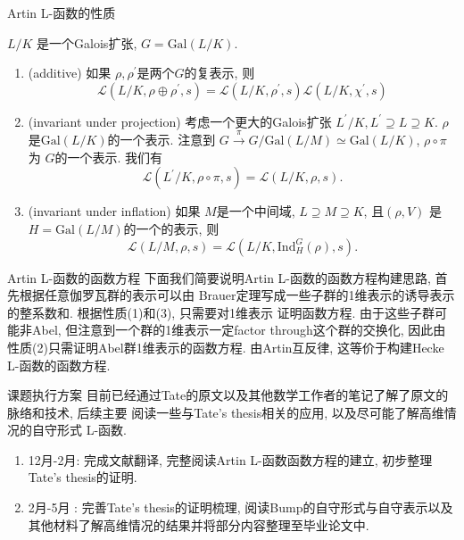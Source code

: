\documentclass[aspectratio=169]{beamer}
\theoremstyle{definition}
\newcommand{\p}{^{\prime}}
\newcommand{\rarr}[1]{\xrightarrow{#1}}
\newenvironment{enu}{\begin{enumerate}[(1)]}{\end{enumerate}}
\begin{document}
\begin{frame}{Artin L-函数的性质}
   
        $L/K$ 是一个Galois扩张, $G=\text{Gal}(L/K)$.
    \begin{enu}   
        \item (additive) 如果 $\rho,\rho\p$是两个$G$的复表示, 则
        $$
        \mathcal{L}\left(L/K, \rho\oplus \rho\p, s\right)=\mathcal{L}(L/K, \rho\p, s) \mathcal{L}\left(L/K, \chi^{\prime}, s\right)
        $$
        \item (invariant under projection) 考虑一个更大的Galois扩张
        $L^{\prime}/K, L^{\prime} \supseteq L \supseteq K$.
        $\rho$是$\text{Gal}(L/K)$的一个表示.
        注意到 $G\rarr{\pi} G/\text{Gal}(L/M)\simeq \text{Gal}(L/K)$,
        $\rho\circ \pi$ 为 $G$的一个表示.
        我们有
        $$
        \mathcal{L}\left(L^{\prime}/K, \rho\circ \pi, s\right)=\mathcal{L}(L/K, \rho, s) .
        $$
        \item (invariant under inflation) 如果 $M$是一个中间域, $L \supseteq M \supseteq K$, 
        且$(\rho,V)$ 是$H=\text{Gal}(L/M)$的一个的表示, 
        则
        $$
        \mathcal{L}(L/M, \rho, s)=\mathcal{L}\left(L/K, \text{Ind}_{H}^G(\rho), s\right) .
        $$
    \end{enu}
    
\end{frame}
\begin{frame}{Artin L-函数的函数方程}
    下面我们简要说明Artin L-函数的函数方程构建思路, 首先根据任意伽罗瓦群的表示可以由
    Brauer定理写成一些子群的1维表示的诱导表示的整系数和. 根据性质(1)和(3), 只需要对1维表示
    证明函数方程. 由于这些子群可能非Abel, 但注意到一个群的1维表示一定factor through这个群的交换化, 
    因此由性质(2)只需证明Abel群1维表示的函数方程. 由Artin互反律, 这等价于构建Hecke L-函数的函数方程. 
\end{frame}




\begin{frame}{课题执行方案}
    目前已经通过Tate的原文以及其他数学工作者的笔记了解了原文的脉络和技术, 后续主要
    阅读一些与Tate's thesis相关的应用, 
    以及尽可能了解高维情况的自守形式 L-函数.
    \begin{enu}
        \item 12月-2月: 完成文献翻译, 完整阅读Artin L-函数函数方程的建立, 初步整理Tate's thesis的证明.
        \item 2月-5月 : 完善Tate's thesis的证明梳理, 
        阅读Bump的自守形式与自守表示以及其他材料了解高维情况的结果并将部分内容整理至毕业论文中.
    \end{enu}
\end{frame}
\end{document}
